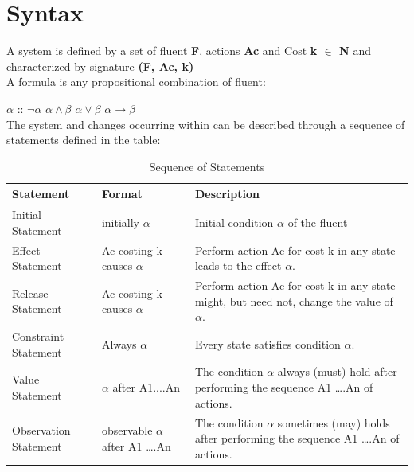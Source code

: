 \documentclass[11pt]{article}
\begin{document}
\section{Syntax}\label{sec:syntax}
A system is defined by a set of fluent {\bfseries F}, actions {\bfseries Ac} and Cost {\bfseries k \(\in\) N} and characterized by signature {\bfseries(F, Ac, k)}\\
A formula is any propositional combination of fluent:

$\alpha$ :: $\neg\alpha$ \textbar $\alpha\wedge\beta$ \textbar $\alpha\vee\beta$ \textbar $\alpha\rightarrow\beta$\\ 
The system and changes occurring within can be described through a sequence of statements defined in the table:
\begin{table}[h]
\centering
\begin{adjustbox}{width=\textwidth}
\begin{tabular}{|l|l|l|}
\hline
\bfseries Statement & \bfseries Format & \bfseries Description\\
\hline
Initial Statement & initially \(\alpha\) & Initial condition \(\alpha\) of the fluent \\
\hline
Effect Statement & Ac costing k causes \(\alpha\) & Perform action Ac for cost k in any state leads to the effect \(\alpha\).\\
\hline	
Release Statement & Ac costing k causes \(\alpha\) & Perform action Ac for cost k in any state might, but need not, change the value of \(\alpha\).\\
\hline
Constraint Statement & Always \(\alpha\) & Every state satisfies condition \(\alpha\).\\
\hline
Value Statement & \(\alpha\) after A1....An & The condition \(\alpha\) always (must) hold after performing the sequence A1 ….An of actions.\\
\hline
Observation Statement & observable \(\alpha\) after A1 ….An & The condition \(\alpha\) sometimes (may) holds after performing the sequence A1 ….An of actions.\\
\hline
\end{tabular}
\end{adjustbox} 
\caption{Sequence of Statements}
\label{tab:table01}
\end{table}
\end{document}
